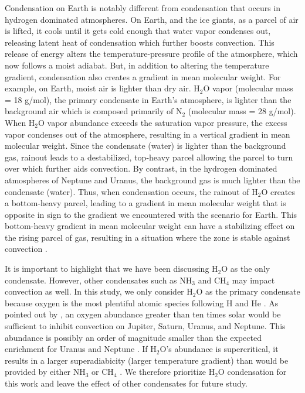 \documentclass[11pt]{ucscthesisbs}
\begin{document}
Condensation on Earth is notably different from condensation that occurs in hydrogen dominated atmospheres. On Earth, and the ice giants, as a parcel of air is lifted, it cools until it gets cold enough that water vapor condenses out, releasing latent heat of condensation which further boosts convection. This release of energy alters the temperature-pressure profile of the atmosphere, which now follows a moist adiabat. But, in addition to altering the temperature gradient, condensation also creates a gradient in mean molecular weight. For example, on Earth, moist air is lighter than dry air. H$_{2}$O vapor (molecular mass = 18 g/mol), the primary condensate in Earth's atmosphere, is lighter than the background air which is composed primarily of N$_{2}$ (molecular mass = 28 g/mol). When H$_{2}$O vapor abundance exceeds the saturation vapor pressure, the excess vapor condenses out of the atmosphere, resulting in a vertical gradient in mean molecular weight. Since the condensate (water) is lighter than the background gas, rainout leads to a destabilized, top-heavy parcel allowing the parcel to turn over which further aids convection. By contrast, in the hydrogen dominated atmospheres of Neptune and Uranus, the background gas is much lighter than the condensate (water). Thus, when condensation occurs, the rainout of H$_{2}$O creates a bottom-heavy parcel, leading to a gradient in mean molecular weight that is opposite in sign to the gradient we encountered with the scenario for Earth. This bottom-heavy gradient in mean molecular weight can have a stabilizing effect on the rising parcel of gas, resulting in a situation where the zone is stable against convection \citep{guillot_1995,friedson_2017,leconte_2017}. 

It is important to highlight that we have been discussing H$_{2}$O as the only condensate. However, other condensates such as NH$_{3}$ and CH$_{4}$ may impact convection as well. In this study, we only consider H$_{2}$O as the primary condensate because oxygen is the most plentiful atomic species following H and He \citep{leconte_2017}. As pointed out by \citep{guillot_1995}, an oxygen abundance greater than ten times solar would be sufficient to inhibit convection on Jupiter, Saturn, Uranus, and Neptune. This abundance is possibly an order of magnitude smaller than the expected enrichment for Uranus and Neptune \citep{2016arXiv160604510A}. If H$_{2}$O's abundance is supercritical, it results in a larger superadiabicity (larger temperature gradient) than would be provided by either NH$_{3}$ or CH$_{4}$ \citep{guillot_1995}. We therefore prioritize H$_{2}$O condensation for this work and leave the effect of other condensates for future study. 
\end{document}
